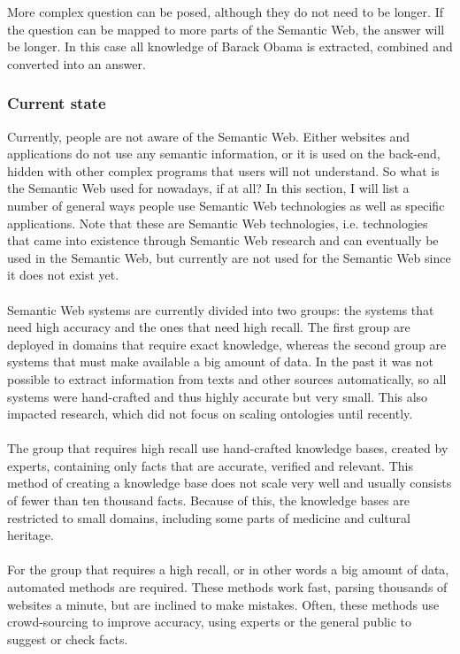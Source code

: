 \documentclass{article}
\begin{document}
 More complex question can be posed, although they do not need to be longer. If the question can be mapped to more parts of the Semantic Web, the answer will be longer. In this case all knowledge of Barack Obama is extracted, combined and converted into an answer.
 
 \subsubsection{Current state} %
 Currently, people are not aware of the Semantic Web. Either websites and applications do not use any semantic information, or it is used on the back-end, hidden with other complex programs that users will not understand. So what is the Semantic Web used for nowadays, if at all? In this section, I will list a number of general ways people use Semantic Web technologies as well as specific applications. Note that these are Semantic Web technologies, i.e. technologies that came into existence through Semantic Web research and can eventually be used in the Semantic Web, but currently are not used for the Semantic Web since it does not exist yet.
 \paragraph{}
 Semantic Web systems are currently divided into two groups: the systems that need high accuracy and the ones that need high recall. The first group are deployed in domains that require exact knowledge, whereas the second group are systems that must make available a big amount of data. In the past it was not possible to extract information from texts and other sources automatically, so all systems were hand-crafted and thus highly accurate but very small. This also impacted research, which did not focus on scaling ontologies until recently.
 \paragraph{}
 The group that requires high recall use hand-crafted knowledge bases, created by experts, containing only facts that are accurate, verified and relevant\cite{mika2015schema}. This method of creating a knowledge base does not scale very well and usually consists of fewer than ten thousand facts. Because of this, the knowledge bases are restricted to small domains, including some parts of medicine and cultural heritage\cite{byrne, le2002}.
 \paragraph{}
 For the group that requires a high recall, or in other words a big amount of data, automated methods are required. These methods work fast, parsing thousands of websites a minute, but are inclined to make mistakes. Often, these methods use crowd-sourcing to improve accuracy, using experts or the general public to suggest or check facts\cite{zhou2007}.
\end{document}
